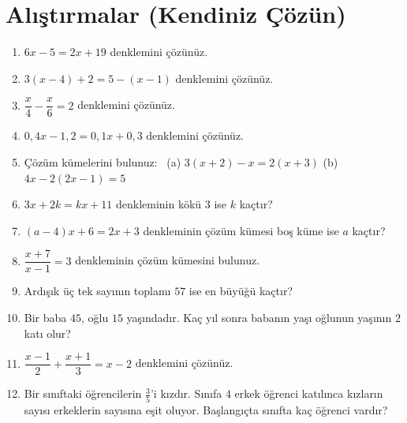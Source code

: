\kendinizoncesi
\section{Alıştırmalar (Kendiniz Çözün)}

\begin{enumerate}[label=\textbf{\arabic*.},leftmargin=*,itemsep=6pt]
\item \(6x-5=2x+19\) denklemini çözünüz.
\item \(3(x-4)+2=5-(x-1)\) denklemini çözünüz.
\item \(\dfrac{x}{4}-\dfrac{x}{6}=2\) denklemini çözünüz.
\item \(0{,}4x-1{,}2=0{,}1x+0{,}3\) denklemini çözünüz.
\item Çözüm kümelerini bulunuz: \ (a) \(3(x+2)-x=2(x+3)\) \qquad (b) \(4x-2(2x-1)=5\)
\item \(3x+2k=kx+11\) denkleminin kökü \(3\) ise \(k\) kaçtır?
\item \((a-4)x+6=2x+3\) denkleminin çözüm kümesi boş küme ise \(a\) kaçtır?
\item \(\dfrac{x+7}{x-1}=3\) denkleminin çözüm kümesini bulunuz.
\item Ardışık üç tek sayının toplamı \(57\) ise en büyüğü kaçtır?
\item Bir baba \(45\), oğlu \(15\) yaşındadır. Kaç yıl sonra babanın yaşı oğlunun yaşının \(2\) katı olur?
\item \(\dfrac{x-1}{2}+\dfrac{x+1}{3}=x-2\) denklemini çözünüz.
\item Bir sınıftaki öğrencilerin \(\frac{3}{5}\)'i kızdır. Sınıfa \(4\) erkek öğrenci katılınca kızların sayısı erkeklerin sayısına eşit oluyor. Başlangıçta sınıfta kaç öğrenci vardır?
\end{enumerate}

